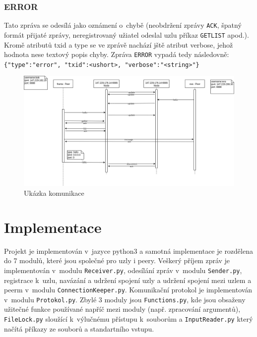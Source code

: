 \documentclass[11pt,a4paper,titlepage]{article}
\begin{document}
            \subsubsection{ERROR}
                Tato zpráva se odesílá jako oznámení o~chybě (neobdržení zprávy \texttt{ACK}, špatný formát přijaté zprávy, neregistrovaný užiatel
                odeslal uzlu příkaz \texttt{GETLIST} apod.). Kromě atributů txid a type se ve zprávě nachází jště atribut verbose, jehož
                hodnota nese textový popis chyby. Zpráva \texttt{ERROR} vypadá tedy následovně: \verb+{"type":"error", "txid":<ushort>, "verbose":"<string>"}+

    \begin{figure}[htbp]
        \begin{center}
            \includegraphics[scale=0.5]{protokol.png}
            \caption{Ukázka komunikace}
            \label{base}
        \end{center}
    \end{figure}

    \section{Implementace}
        Projekt je implementován v~jazyce python3 a samotná implementace je rozdělena do 7 modulů, které jsou společné pro uzly i peery.
        Veškerý příjem zpráv je implementován v~modulu \texttt{Receiver.py}, odesílání zpráv v~modulu \texttt{Sender.py}, registrace k~uzlu,
        navázání a udržení spojení uzly a udržení spojení mezi uzlem a peerm v~modulu \texttt{ConnectionKeeper.py}. Komunikační protokol je
        implementován v~modulu \texttt{Protokol.py}. Zbylé 3 moduly jsou \texttt{Functions.py},
        kde jsou obsaženy užitečné funkce používané napříč mezi moduly (např. zpracování argumentů), \texttt{FileLock.py} sloužící k~výlučnému přístupu
        k~souborům a \texttt{InputReader.py} který načítá příkazy ze souborů a standartního vstupu.
\end{document}
